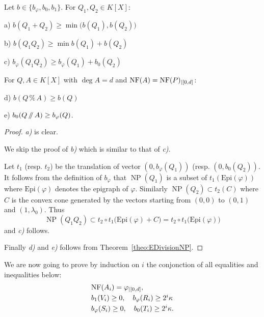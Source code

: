 \documentclass{sig-alternate-2013}
\DeclareMathOperator{\NP}{NP}
\newcommand{\NF}{\text{\rm NF}}
\renewcommand{\mod}{\,\%\,}
\renewcommand{\div}{\,/\hspace{-0.3em}/\,}
\newcommand{\Epi}{\textrm{Epi}}
\begin{document}
\begin{lem}
\label{lem:bphib0}
Let $b \in \{b_\varphi, b_0, b_1\}$. For $Q_1, Q_2 \in K[X]$:

\smallskip

a) $b(Q_1+Q_2) \geq \min \big(b(Q_1), b(Q_2)\big)$

\smallskip

b) $b(Q_1Q_2) \geq \min b(Q_1) + b(Q_2)$ 

\smallskip

c) $b_\varphi(Q_1 Q_2) \geq b_\varphi(Q_1) + b_0(Q_2)$

\smallskip

\noindent
For $Q, A \in K[X]$ with $\deg A = d$ and $\NF(A) =
\NF(P)_{|[0,d]}$:

\smallskip

d) $b(Q \mod A) \geq b(Q)$

\smallskip

e) $b_0(Q \div A) \geq b_\varphi(Q)$.
\end{lem}

\begin{proof}
\emph{a)} is clear.

We skip the proof of \emph{b)} which is similar to that of \emph{c)}.

Let $t_1$ (resp. $t_2$) be the translation of vector $(0, b_\varphi
(Q_1))$ (resp. $(0, b_0(Q_2))$. It follows from the definition of
$b_\varphi$ that $\NP(Q_1)$ is a subset of $t_1(\Epi(\varphi))$ where
$\Epi(\varphi)$ denotes the epigraph of $\varphi$. Similarly $\NP(Q_2)
\subset t_2(C)$ where $C$ is the convex cone generated by the vectors 
starting from $(0,0)$ to $(0,1)$ and $(1, \lambda_0)$. Thus
$$\NP(Q_1 Q_2) \subset t_2 \circ t_1 \big(\Epi(\varphi) + C\big) =
t_2 \circ t_1\big(\Epi(\varphi)\big)$$
and \emph{c)} follows.

Finally \emph{d)} and \emph{e)} follows from
Theorem~\ref{theo:EDivisionNP}.
\end{proof}

We are now going to prove by induction on $i$ the conjonction of all
equalities and inequalities below:
\begin{equation}
\label{eq:induction}
\begin{array}{l}
\NF(A_i) = \varphi_{|[0,d]}, \smallskip \\
b_1(V_i) \geq 0, \quad
b_\varphi(R_i) \geq 2^i \kappa \smallskip \\
b_\varphi(S_i) \geq 0, \quad
b_0(T_i) \geq 2^i \kappa.
\end{array}
\end{equation}
\end{document}
